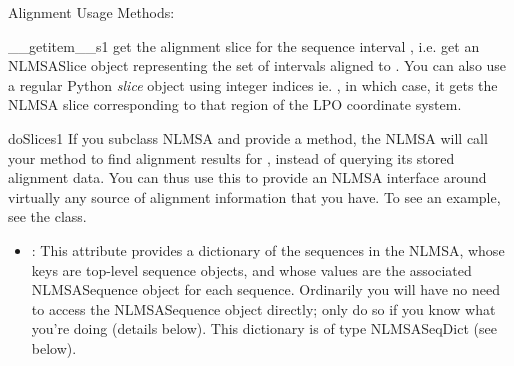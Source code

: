 \documentclass{howto}
\begin{document}
Alignment Usage Methods:

\begin{funcdesc}{__getitem__}{s1}
  get the alignment slice for the sequence interval ,
  i.e. get an NLMSASlice object representing the set of intervals aligned to .
  You can also use a regular Python {\em slice} object using integer indices
  ie. , in which case, it gets the NLMSA slice corresponding to that 
  region of the LPO coordinate system.
\end{funcdesc}

\begin{funcdesc}{doSlice}{s1}
  If you subclass NLMSA and provide a  method, the NLMSA will
  call your  method to find alignment results for ,
  instead of querying its stored alignment data.  You can thus use this 
  to provide an NLMSA interface around virtually any source of alignment information
  that you have.  To see an example, see the  class.  
\end{funcdesc}

\begin{itemize}
\item
{}: This attribute provides a dictionary of the sequences in
the NLMSA, whose keys are top-level sequence objects, and whose values are
the associated NLMSASequence object for each sequence.  Ordinarily you will have
no need to access the NLMSASequence object directly; only do so if you know what
you're doing (details below).  This dictionary is of type NLMSASeqDict (see below).

\end{itemize}
\end{document}
